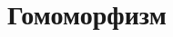 \documentclass[../main/document.tex]{subfiles}
\begin{document}
\section{Гомоморфизм}
\end{document}
